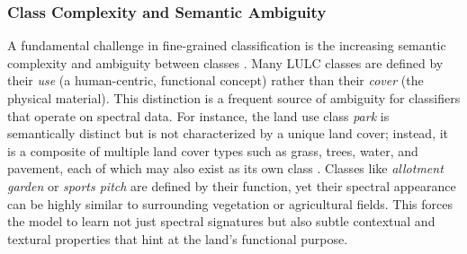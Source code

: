 \documentclass{report}
\begin{document}
\subsubsection{Class Complexity and Semantic Ambiguity}
A fundamental challenge in fine-grained classification is the increasing semantic complexity and ambiguity between classes \parencite[p.~1f.]{SertelEtAlLandUseLandCoverMappingUsingDeepLearningBasedSegmentationApproachesVHRWorldview3Images2022}. Many LULC classes are defined by their \textit{use} (a human-centric, functional concept) rather than their \textit{cover} (the physical material). This distinction is a frequent source of ambiguity for classifiers that operate on spectral data. For instance, the land use class \textit{park} is semantically distinct but is not characterized by a unique land cover; instead, it is a composite of multiple land cover types such as grass, trees, water, and pavement, each of which may also exist as its own class \parencites[p.~313]{KotaridisLazaridouRemotesensingimagesegmentationadvancesmetaanalysis2021a}. Classes like \textit{allotment garden} or \textit{sports pitch} are defined by their function, yet their spectral appearance can be highly similar to surrounding vegetation or agricultural fields. This forces the model to learn not just spectral signatures but also subtle contextual and textural properties that hint at the land's functional purpose.
\end{document}

